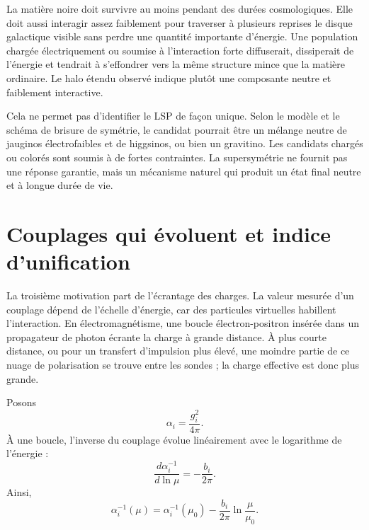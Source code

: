La matière noire doit survivre au moins pendant des durées cosmologiques. Elle doit aussi interagir assez faiblement pour traverser à plusieurs reprises le disque galactique visible sans perdre une quantité importante d’énergie. Une population chargée électriquement ou soumise à l’interaction forte diffuserait, dissiperait de l’énergie et tendrait à s’effondrer vers la même structure mince que la matière ordinaire. Le halo étendu observé indique plutôt une composante neutre et faiblement interactive.

Cela ne permet pas d’identifier le LSP de façon unique. Selon le modèle et le schéma de brisure de symétrie, le candidat pourrait être un mélange neutre de jauginos électrofaibles et de higgsinos, ou bien un gravitino. Les candidats chargés ou colorés sont soumis à de fortes contraintes. La supersymétrie ne fournit pas une réponse garantie, mais un mécanisme naturel qui produit un état final neutre et à longue durée de vie.

\section{Couplages qui évoluent et indice d’unification}

La troisième motivation part de l’écrantage des charges. La valeur mesurée d’un couplage dépend de l’échelle d’énergie, car des particules virtuelles habillent l’interaction. En électromagnétisme, une boucle électron-positron insérée dans un propagateur de photon écrante la charge à grande distance. À plus courte distance, ou pour un transfert d’impulsion plus élevé, une moindre partie de ce nuage de polarisation se trouve entre les sondes ; la charge effective est donc plus grande.

Posons
\begin{equation}
\alpha_i=\frac{g_i^2}{4\pi}.
\end{equation}
À une boucle, l’inverse du couplage évolue linéairement avec le logarithme de l’énergie :
\begin{equation}
\frac{d\alpha_i^{-1}}{d\ln\mu}
=-\frac{b_i}{2\pi}.
\end{equation}
Ainsi,
\begin{equation}
\alpha_i^{-1}(\mu)
=\alpha_i^{-1}(\mu_0)
-\frac{b_i}{2\pi}\ln\frac{\mu}{\mu_0}.
\end{equation}

